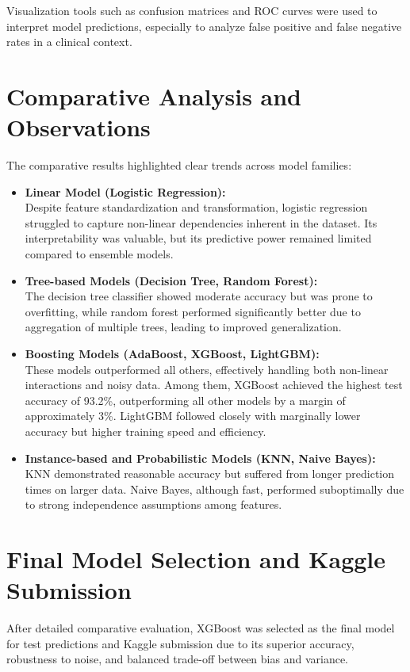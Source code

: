 Visualization tools such as confusion matrices and ROC curves were used to interpret model predictions, especially to analyze false positive and false negative rates in a clinical context.


\section{Comparative Analysis and Observations}\label{sec:comparative-analysis-and-observations}
The comparative results highlighted clear trends across model families:

\begin{itemize}
    \item \textbf{Linear Model (Logistic Regression):}\\
    Despite feature standardization and transformation, logistic regression struggled to capture non-linear dependencies inherent in the dataset.
    Its interpretability was valuable, but its predictive power remained limited compared to ensemble models.

    \item \textbf{Tree-based Models (Decision Tree, Random Forest):}\\
    The decision tree classifier showed moderate accuracy but was prone to overfitting, while random forest performed significantly better due to aggregation of multiple trees, leading to improved generalization.

    \item \textbf{Boosting Models (AdaBoost, XGBoost, LightGBM):}\\
    These models outperformed all others, effectively handling both non-linear interactions and noisy data.
    Among them, XGBoost achieved the highest test accuracy of 93.2\%, outperforming all other models by a margin of approximately 3\%.
    LightGBM followed closely with marginally lower accuracy but higher training speed and efficiency.

    \item \textbf{Instance-based and Probabilistic Models (KNN, Naive Bayes):}\\
    KNN demonstrated reasonable accuracy but suffered from longer prediction times on larger data.
    Naive Bayes, although fast, performed suboptimally due to strong independence assumptions among features.
\end{itemize}


\section{Final Model Selection and Kaggle Submission}\label{sec:final-model-selection-and-kaggle-submission}
After detailed comparative evaluation, XGBoost was selected as the final model for test predictions and Kaggle submission due to its superior accuracy, robustness to noise, and balanced trade-off between bias and variance.

